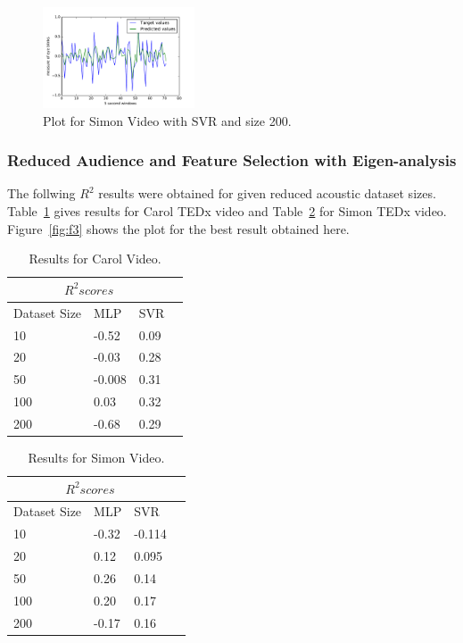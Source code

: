 \begin{figure}
\centering
\includegraphics[width=0.4\textwidth]{f2.pdf}
\caption{\label{fig:f2}Plot for Simon Video with SVR and size 200.}
\end{figure} 

\subsubsection{Reduced Audience and Feature Selection with Eigen-analysis}

The follwing $R^2$ results were obtained for given reduced acoustic dataset sizes. Table~\ref{tab:carol3} gives results for Carol TEDx video and Table~\ref{tab:simon3} for Simon TEDx video. Figure~\ref{fig:f3} shows the plot for the best result obtained here.

\begin{table}
\centering
\begin{tabular}{ |p{3cm}||p{3cm}|p{3cm}|p{3cm}|  }
 \hline
 \multicolumn{3}{|c|}{$R^2 scores$} \\
 \hline
 Dataset Size &MLP &SVR\\
 \hline
 10 & -0.52 & 0.09\\
 20 & -0.03 & 0.28\\
 50 & -0.008 & 0.31\\
 100 & 0.03 & 0.32\\
 200 & -0.68 & 0.29\\
 \hline
\end{tabular}
\caption{\label{tab:carol3}Results for Carol Video.}
\end{table}

\begin{table}
\centering
\begin{tabular}{ |p{3cm}||p{3cm}|p{3cm}|p{3cm}|  }
 \hline
 \multicolumn{3}{|c|}{$R^2 scores$} \\
 \hline
 Dataset Size &MLP &SVR\\
 \hline
 10 & -0.32 & -0.114\\
 20 & 0.12 & 0.095\\
 50 & 0.26 & 0.14\\
 100 & 0.20 & 0.17\\
 200 & -0.17 & 0.16\\
 \hline
\end{tabular}
\caption{\label{tab:simon3}Results for Simon Video.}
\end{table}

